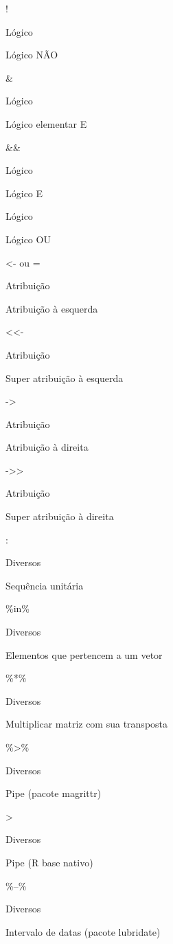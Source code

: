 \documentclass[
]{article}
\begin{document}
\begin{itemize}
\begin{itemize}
\begin{itemize}
      !

      Lógico

      Lógico NÃO

      \&

      Lógico

      Lógico elementar E

      \&\&

      Lógico

      Lógico E

      \textbar\textbar{}

      Lógico

      Lógico OU

      \textless- ou =

      Atribuição

      Atribuição à esquerda

      \textless\textless-

      Atribuição

      Super atribuição à esquerda

      -\textgreater{}

      Atribuição

      Atribuição à direita

      -\textgreater\textgreater{}

      Atribuição

      Super atribuição à direita

      :

      Diversos

      Sequência unitária

      \%in\%

      Diversos

      Elementos que pertencem a um vetor

      \%*\%

      Diversos

      Multiplicar matriz com sua transposta

      \%\textgreater\%

      Diversos

      Pipe (pacote magrittr)

      \textbar\textgreater{}

      Diversos

      Pipe (R base nativo)

      \%--\%

      Diversos

      Intervalo de datas (pacote lubridate)
    \end{itemize}
  \end{itemize}
\end{itemize}
\end{document}
